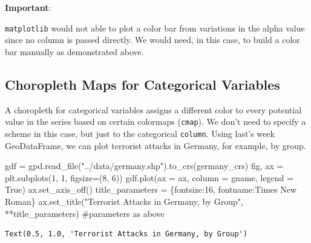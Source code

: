 \documentclass[
  letterpaper,
  DIV=11,
  numbers=noendperiod]{scrreprt}
\newenvironment{Shaded}{\begin{snugshade}}{\end{snugshade}}
\newcommand{\CommentTok}[1]{\textcolor[rgb]{0.37,0.37,0.37}{#1}}
\newcommand{\DecValTok}[1]{\textcolor[rgb]{0.68,0.00,0.00}{#1}}
\newcommand{\NormalTok}[1]{\textcolor[rgb]{0.00,0.23,0.31}{#1}}
\newcommand{\OperatorTok}[1]{\textcolor[rgb]{0.37,0.37,0.37}{#1}}
\newcommand{\StringTok}[1]{\textcolor[rgb]{0.13,0.47,0.30}{#1}}
\newcommand{\VariableTok}[1]{\textcolor[rgb]{0.07,0.07,0.07}{#1}}
\begin{document}
\textbf{Important}:

\texttt{matplotlib} would not able to plot a color bar from variations
in the alpha value since no column is passed directly. We would need, in
this case, to build a color bar manually as demonstrated above.

\hypertarget{choropleth-maps-for-categorical-variables}{%
\subsection{Choropleth Maps for Categorical
Variables}\label{choropleth-maps-for-categorical-variables}}

A choropleth for categorical variables assigns a different color to
every potential value in the series based on certain colormaps
(\texttt{cmap}). We don't need to specify a scheme in this case, but
just to the categorical \texttt{column}. Using last's week GeoDataFrame,
we can plot terrorist attacks in Germany, for example, by group.

\begin{Shaded}
\begin{Highlighting}[]
\NormalTok{gdf }\OperatorTok{=}\NormalTok{ gpd.read\_file(}\StringTok{"../data/germany.shp"}\NormalTok{).to\_crs(germany\_crs)}
\NormalTok{fig, ax }\OperatorTok{=}\NormalTok{ plt.subplots(}\DecValTok{1}\NormalTok{, }\DecValTok{1}\NormalTok{, figsize}\OperatorTok{=}\NormalTok{(}\DecValTok{8}\NormalTok{, }\DecValTok{6}\NormalTok{))}
\NormalTok{gdf.plot(ax }\OperatorTok{=}\NormalTok{ ax, column }\OperatorTok{=} \StringTok{\textquotesingle{}gname\textquotesingle{}}\NormalTok{, legend }\OperatorTok{=} \VariableTok{True}\NormalTok{)}
\NormalTok{ax.set\_axis\_off()}
\NormalTok{title\_parameters }\OperatorTok{=}\NormalTok{ \{}\StringTok{\textquotesingle{}fontsize\textquotesingle{}}\NormalTok{:}\StringTok{\textquotesingle{}16\textquotesingle{}}\NormalTok{, }\StringTok{\textquotesingle{}fontname\textquotesingle{}}\NormalTok{:}\StringTok{\textquotesingle{}Times New Roman\textquotesingle{}}\NormalTok{\}}
\NormalTok{ax.set\_title(}\StringTok{"Terrorist Attacks in Germany, by Group"}\NormalTok{, }\OperatorTok{**}\NormalTok{title\_parameters) }\CommentTok{\#parameters as above}
\end{Highlighting}
\end{Shaded}

\begin{verbatim}
Text(0.5, 1.0, 'Terrorist Attacks in Germany, by Group')
\end{verbatim}
\end{document}
